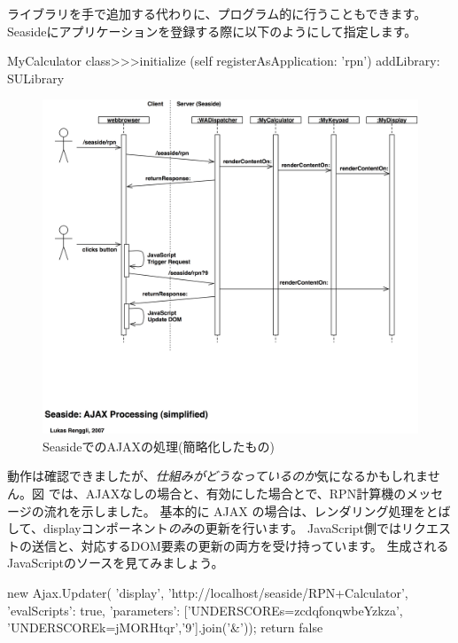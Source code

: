 \documentclass[a4paper,10pt,twoside]{book}
\begin{document}
ライブラリを手で追加する代わりに、プログラム的に行うこともできます。Seasideにアプリケーションを登録する際に以下のようにして指定します。

\begin{code}{}
MyCalculator class>>>initialize
	(self registerAsApplication: 'rpn')
		addLibrary: SULibrary
\end{code}

\begin{figure}[ht]
\begin{center}
\includegraphics[width=\textwidth]{ajax-processing}
\caption{SeasideでのAJAXの処理(簡略化したもの)}
\end{center}
\end{figure}


動作は確認できましたが、\emph{仕組みがどうなっているのか}気になるかもしれません。図 では、AJAXなしの場合と、有効にした場合とで、RPN計算機のメッセージの流れを示しました。
基本的に AJAX の場合は、レンダリング処理をとばして、displayコンポーネント\emph{のみ}の更新を行います。
JavaScript側ではリクエストの送信と、対応するDOM要素の更新の両方を受け持っています。
生成されるJavaScriptのソースを見てみましょう。

\begin{code}{}
new Ajax.Updater(
	'display',
	'http://localhost/seaside/RPN+Calculator',
	{'evalScripts': true,
	  'parameters': ['UNDERSCOREs=zcdqfonqwbeYzkza', 'UNDERSCOREk=jMORHtqr','9'].join('&')});
return false
\end{code}
\end{document}
